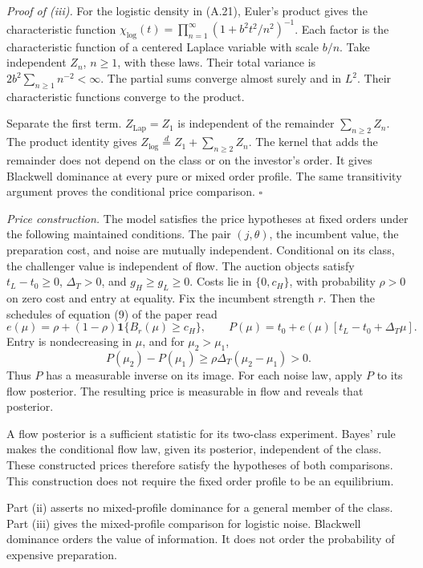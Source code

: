 \documentclass[
  11pt,
]{article}
\begin{document}
\emph{Proof of (iii).} For the logistic density in (A.21), Euler's product gives the characteristic function
\(\chi_{\mathrm{log}}(t)=\prod_{n=1}^{\infty}(1+b^2t^2/n^2)^{-1}\).
Each factor is the characteristic function of a centered Laplace variable with scale \(b/n\).
Take independent \(Z_n\), \(n\ge1\), with these laws.
Their total variance is \(2b^2\sum_{n\ge1}n^{-2}<\infty\).
The partial sums converge almost surely and in \(L^2\).
Their characteristic functions converge to the product.
\par
Separate the first term.
\(Z_{\mathrm{Lap}}=Z_1\) is independent of the remainder \(\sum_{n\ge2}Z_n\).
The product identity gives \(Z_{\mathrm{log}}\overset d=Z_1+\sum_{n\ge2}Z_n\).
The kernel that adds the remainder does not depend on the class or on the investor's order.
It gives Blackwell dominance at every pure or mixed order profile.
The same transitivity argument proves the conditional price comparison. \(\square\)

\emph{Price construction.}
The model satisfies the price hypotheses at fixed orders under the following maintained conditions.
The pair \((j,\theta)\), the incumbent value, the preparation cost, and noise are mutually independent.
Conditional on its class, the challenger value is independent of flow.
The auction objects satisfy \(t_L-t_0\ge0\), \(\Delta_T>0\), and \(g_H\ge g_L\ge0\).
Costs lie in \(\{0,c_H\}\), with probability \(\rho>0\) on zero cost and entry at equality.
Fix the incumbent strength \(r\). Then the schedules of equation (9) of the paper read
\[
e(\mu)=\rho+(1-\rho)\mathbf1\{B_r(\mu)\ge c_H\},\qquad
P(\mu)=t_0+e(\mu)[t_L-t_0+\Delta_T\mu].
\]
Entry is nondecreasing in \(\mu\), and for \(\mu_2>\mu_1\),
\[
P(\mu_2)-P(\mu_1)\ge\rho\Delta_T(\mu_2-\mu_1)>0.
\]
Thus \(P\) has a measurable inverse on its image.
For each noise law, apply \(P\) to its flow posterior.
The resulting price is measurable in flow and reveals that posterior.
\par
A flow posterior is a sufficient statistic for its two-class experiment.
Bayes' rule makes the conditional flow law, given its posterior, independent of the class.
These constructed prices therefore satisfy the hypotheses of both comparisons.
This construction does not require the fixed order profile to be an equilibrium.

Part (ii) asserts no mixed-profile dominance for a general member of the class.
Part (iii) gives the mixed-profile comparison for logistic noise.
Blackwell dominance orders the value of information.
It does not order the probability of expensive preparation.
\end{document}
